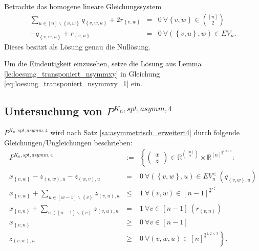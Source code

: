 \documentclass[10p,a4paper,BCOR = 12mm, DIV=15]{scrbook}
\begin{document}
\begin{Kor}
\label{kor:loesung_transponiert_nsymmxy}
Betrachte das homogene lineare Gleichungssystem
\begin{eqnarray}
\sum_{u\in[n]\backslash\left\{v, w\right\}} q_{\left\{v, w, u\right\}} + 2 r_{\left\{v, w\right\}} & = & 0 \ \forall \left\{v, w\right\}\in {[n] \choose 2} \label{eq:loesung_transponiert_nsymmxy_1} \\
-q_{\left\{v, w, u\right\}} + r_{\left\{v, u\right\}} & = &  0\ \forall \left(\left\{v, u\right\}, w\right)\in EV_n. \nonumber
\end{eqnarray}
Dieses besitzt als Lösung genau die Nullösung.
\end{Kor}
\begin{bew}
Um die Eindeutigkeit einzusehen, setze die Lösung aus Lemma \ref{le:loesung_transponiert_nsymmxy} in Gleichung \eqref{eq:loesung_transponiert_nsymmxy_1} ein.
\end{bew}

\subsection{Untersuchung von $P^{K_n, spt, asymm, 4}$}

\label{sec:untersuchung_Pnasymm4}

$P^{K_n, spt, asymm, 4}$ wird nach Satz \ref{sa:asymmetrisch_erweitert4} durch folgende Gleichungen/Ungleichungen beschrieben:
\begin{eqnarray}
P^{K_n, spt, asymm, 4} & := & \left\{
\left(\begin{array}{c}
x \\
z
\end{array}\right)\in \mathbb{R}^{[n]\choose 2} \times \mathbb{R}^{\left[n\right]^{\underline{3}^{1, 2<3}}}: \nonumber\right. \nonumber \\
x_{\left\{v, w\right\}} - z_{\left(v, w\right), u} - z_{\left(w, v\right), u} & = & 0\ \forall \left(\left\{v, w\right\}, u\right)\in EV_n^< \ \left(q_{\left\{v, w\right\}, u}\right) \nonumber \\
x_{\left\{v, w\right\}} + \sum_{u\in[w-1]\backslash\left\{v\right\}} z_{\left(v, u\right), w} & \leq & 1\ \forall \left(v, w\right)\in {[n-1]^{\underline{2}}}^<  \label{eq:to_check_strict} \\
x_{\left\{v, n\right\}} + \sum_{u\in[n-1]\backslash\left\{v\right\}} z_{\left(v, u\right), n} & = & 1\ \forall v\in [n-1] \ \left(r_{\left(v, n\right)}\right) \nonumber \\
x_{\left\{v, n\right\}} & \geq & 0 \ \forall v\in \left[n-1\right] \nonumber \\
z_{\left(v, w\right), u} & \geq & \left. 0 \ \forall \left(v, w, u\right)\in \left[n\right]^{\underline{3}^{1, 2<3}} \right\}. \nonumber
\end{eqnarray}
\end{document}
